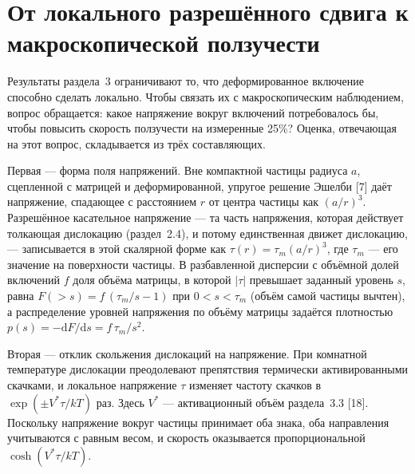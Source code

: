 \section{От локального разрешённого сдвига к макроскопической ползучести}

Результаты раздела~3 ограничивают то, что деформированное включение
способно сделать локально. Чтобы связать их с макроскопическим наблюдением,
вопрос обращается: какое напряжение вокруг включений потребовалось бы, чтобы
повысить скорость ползучести на измеренные 25\%? Оценка, отвечающая на этот
вопрос, складывается из трёх составляющих.

Первая --- форма поля напряжений. Вне компактной частицы радиуса $a$,
сцепленной с матрицей и деформированной, упругое решение Эшелби [7] даёт
напряжение, спадающее с расстоянием $r$ от центра частицы как $(a/r)^{3}$.
Разрешённое касательное напряжение --- та часть напряжения, которая действует
толкающая дислокацию (раздел~2.4), и потому единственная
движет дислокацию, --- записывается в этой скалярной форме как
$\tau(r) = \tau_m (a/r)^{3}$, где $\tau_m$ --- его значение на поверхности
частицы. В разбавленной дисперсии с объёмной долей включений $f$ доля объёма
матрицы, в которой $|\tau|$ превышает заданный уровень $s$, равна
$F(>s) = f\,(\tau_m/s - 1)$ при $0 < s < \tau_m$ (объём самой частицы
вычтен), а распределение уровней напряжения по объёму матрицы задаётся
плотностью $p(s) = -\mathrm{d}F/\mathrm{d}s = f\,\tau_m/s^{2}$.

Вторая --- отклик скольжения дислокаций на напряжение. При комнатной
температуре дислокации преодолевают препятствия термически активированными
скачками, и локальное напряжение $\tau$ изменяет частоту скачков в
$\exp(\pm V^{*}\tau/kT)$ раз. Здесь $V^{*}$ --- активационный объём раздела~3.3 [18]. Поскольку напряжение вокруг
частицы принимает оба знака, оба направления учитываются с равным весом, и
скорость оказывается пропорциональной $\cosh(V^{*}\tau/kT)$.

